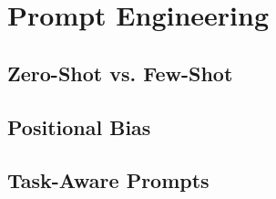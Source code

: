 \section{Prompt Engineering}

\subsection{Zero-Shot vs. Few-Shot}

\subsection{Positional Bias}


\subsection{Task-Aware Prompts}